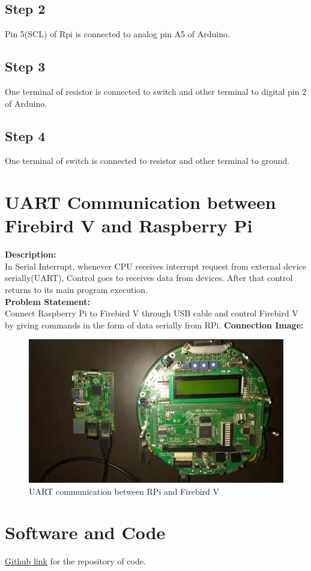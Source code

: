 \documentclass[a4paper,12pt,oneside]{book}
\begin{document}
\subsection*{Step 2}
Pin 5(SCL) of Rpi is connected to analog pin A5 of Arduino.
\subsection*{Step 3}
One terminal of resistor is connected to switch and other terminal to digital pin 2 of Arduino.
\subsection*{Step 4}
One terminal of switch is connected to resistor and other terminal to ground.
\section{UART Communication between Firebird V and Raspberry Pi}
\textbf{Description:} \\
In Serial Interrupt, whenever CPU receives interrupt request from external device serially(UART), Control goes to receives data from devices. After that control returns to its main program execution.\\
\textbf{Problem Statement:} \\
Connect Raspberry Pi to Firebird V through USB cable and control Firebird V by giving commands in the form of data serially from RPi.
\textbf{Connection Image:} \\
\begin{figure}[H]
    \centering
    \includegraphics[scale = 0.05]{fff}
    \caption{UART communication between RPi and Firebird V}
\end{figure}

\newpage
\section{Software and Code}
\href{https://github.com/eYSIP-2016/eYSIP-Raspberry_Pi_Development_Board}{Github link} for the repository of code.
\end{document}
